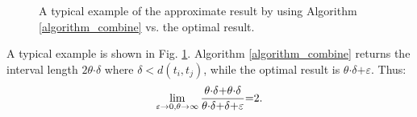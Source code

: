 \documentclass[prodmode,acmtosn]{acmsmall}
\begin{document}
\begin{figure}
\centering
{}
\hspace{3pt}
\caption{A typical example of the approximate result by using Algorithm \ref{algorithm_combine} vs. the optimal result.}
\label{figure3_tight_example}
\end{figure}


A typical example is shown in Fig. \ref{figure3_tight_example}. Algorithm \ref{algorithm_combine} returns the interval length $2 \theta\mathrm{\cdot} \delta$ where $\delta \mathrm{<} d(t_i,t_j)$, while the optimal result is $\theta \mathrm{\cdot} \delta\mathrm{+}\varepsilon$. Thus:
\begin{equation}
 \lim \limits_{\varepsilon \mathrm{\to} 0, \theta \mathrm{\to} \infty} \frac{\theta \mathrm{\cdot} \delta \mathrm{+} \theta \mathrm{\cdot} \delta}{\theta \mathrm{\cdot} \delta \mathrm{+}\delta\mathrm{+} \varepsilon}\mathrm{=}2.
 \vspace{0pt}
\end{equation}
\end{document}
